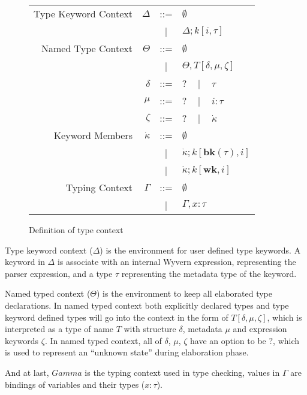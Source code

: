 \documentclass{sig-alternate}
\newcommand{\mycaption}[1]{\vspace{-4px}\caption{#1}\vspace{-2px}}
\begin{document}
\begin{figure}[ht]
\begin{center}
\begin{tabular}{r r c l}
Type Keyword Context & $\Delta$ & ::= & $\emptyset$\\
              &                 &  |  & $\Delta;k[i,\tau]$\\
Named Type Context  & $\Theta$        & ::= & $\emptyset$\\
              &                 &  |  & $\Theta,T[\delta,\mu,\zeta]$\\
              & $\delta$        & ::= & $?$ ~ | ~ $\tau$\\
   & $\mu$           & ::= & $?$ ~ | ~ $i:\tau$\\
   & $\zeta$         & ::= & $?$ ~ | ~ $\dot\kappa$\\
Keyword Members & $\dot\kappa$    & ::= & $\emptyset$\\
            &                 &   |  & $\dot\kappa;k[\mathbf{bk}(\tau),i]$\\
            &                 &   |  & $\dot\kappa;k[\mathbf{wk},i]$\\
Typing Context & $\Gamma$ &   ::=  & $\emptyset$\\
                 &          &     |  & $\Gamma,x:\tau$
\end{tabular}
\end{center}
\mycaption{Definition of type context}
\label{typechecking-environment}
\end{figure}

Type keyword context ($\Delta$) is the environment for user defined type keywords. A keyword in $\Delta$ is associate with an internal Wyvern expression, representing the parser expression, and a type $\tau$ representing the metadata type of the keyword. 

Named typed context ($\Theta$) is the environment to keep all elaborated type declarations. In named typed context both explicitly declared types and type keyword defined types will go into the context in the form of $T[\delta,\mu,\zeta]$, which is interpreted as a type of name $T$ with structure $\delta$, metadata $\mu$ and expression keywords $\zeta$. In named typed context, all of $\delta$, $\mu$, $\zeta$ have an option to be $?$, which is used to represent an ``unknown state'' during elaboration phase. 

And at last, $Gamma$ is the typing context used in type checking, values in $\Gamma$ are bindings of variables and their types ($x:\tau$).
\end{document}
